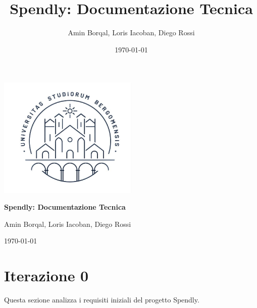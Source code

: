 \documentclass{softwaredoc}
\title{Spendly: Documentazione Tecnica}
\author{Amin Borqal, Loris Iacoban, Diego Rossi}
\date{\today}
\begin{document}
\begin{titlepage}
  \centering
  \vspace*{2cm} %

  \includegraphics[width=0.5\textwidth]{images/Marchio.jpg}\par
  \vspace{1cm}
  
  {\Huge \bfseries Spendly: Documentazione Tecnica\par}
  \vspace{1cm}
  
  {\Large Amin Borqal, Loris Iacoban, Diego Rossi\par}
  \vspace{1cm}
  
  {\Large \today\par}
  \vfill
\end{titlepage}

\tableofcontents
{} %
\newpage
\listoffigures
\listoftables
\newpage 

\section*{Iterazione 0}
Questa sezione analizza i requisiti iniziali del progetto Spendly.


\newpage

\newpage



\newpage

\newpage

\end{document}
